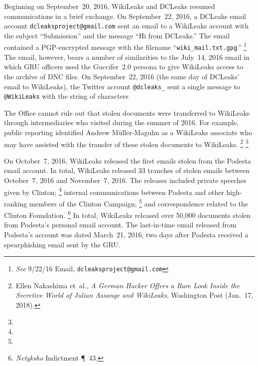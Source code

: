 Beginning on September~20, 2016, WikiLeaks and DCLeaks resumed communications in a brief exchange.
On September~22, 2016, a DCLeaks email account \verb+dcleaksproject@gmail.com+ sent an email to a WikiLeaks account with the subject ``Submission'' and the message ``Hi from DCLeaks.''
The email contained a PGP-encrypted message with the filename ``\verb+wiki_mail.txt.gpg+.''%
\footnote{\textit{See} 9/22/16 Email, \verb+dcleaksproject@gmail.com+ }
The email, however, bears a number of similarities to the July~14, 2016 email in which GRU officers used the Guccifer~2.0 persona to give WikiLeaks access to the archive of DNC files.
On September~22, 2016 (the same day of DCLeaks' email to WikiLeaks), the Twitter account \verb+@dcleaks_+ sent a single message to \verb+@WikiLeaks+ with the string of characters 

The Office cannot rule out that stolen documents were transferred to WikiLeaks through intermediaries who visited during the summer of 2016.
For example, public reporting identified Andrew M{\"u}ller-Maguhn as a WikiLeaks associate who may have assisted with the transfer of these stolen documents to WikiLeaks.%
\footnote{Ellen Nakashima et~al., \textit{A German Hacker Offers a Rare Look Inside the Secretive World of Julian Assange and WikiLeaks}, Washington Post (Jan.~17, 2018).}
\footnote{}

On October~7, 2016, WikiLeaks released the first emails stolen from the Podesta email account.
In total, WikiLeaks released 33 tranches of stolen emails between October~7, 2016 and November~7, 2016.
The releases included private speeches given by Clinton;%
\footnote{}
internal communications between Podesta and other high-ranking members of the Clinton Campaign;%
\footnote{}
and correspondence related to the Clinton Foundation.%
\footnote{\textit{Netyksho} Indictment \P~43.}
In total, WikiLeaks released over 50,000 documents stolen from Podesta's  personal email account.
The last-in-time email released from Podesta's account was dated March~21, 2016, two days after Podesta received a spearphishing email sent by the GRU\null.

